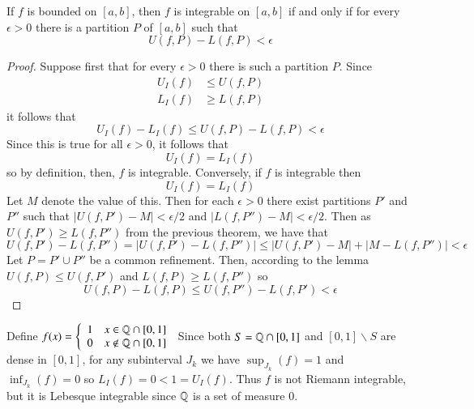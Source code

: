 \begin{theorem}
    If $f$ is bounded on $[a,b]$, then $f$ is integrable on $[a,b]$ if and only if for every $\epsilon > 0$ there is a partition $P$ of $[a, b]$ such that $$U(f,P) - L(f,P) < \epsilon$$
\end{theorem}
\begin{proof}
    Suppose first that for every $\epsilon > 0$ there is such a partition $P$. Since \begin{align*}
        U_I(f) &\leq U(f,P) \\
        L_I(f) &\geq L(f,P)
    \end{align*}
    it follows that \begin{equation*}
        U_I(f) - L_I(f) \leq U(f,P) - L(f,P) < \epsilon
    \end{equation*}
    Since this is true for all $\epsilon > 0$, it follows that \begin{equation*}
        U_I(f) = L_I(f)
    \end{equation*}
    so by definition, then, $f$ is integrable. Conversely, if $f$ is integrable then \begin{equation*}
        U_I(f) = L_I(f)
    \end{equation*}
    Let $M$ denote the value of this. Then for each $\epsilon > 0$ there exist partitions $P'$ and $P''$ such that $|U(f,P') - M| <\epsilon/2$ and $|L(f,P'') - M| < \epsilon/2$. Then as $U(f,P') \geq L(f,P'')$ from the previous theorem, we have that \begin{equation*}
        U(f,P') - L(f,P'') = |U(f,P') - L(f,P'')| \leq |U(f,P') - M| + |M - L(f,P'')| < \epsilon
    \end{equation*}
    Let $P = P' \cup P''$ be a common refinement. Then, according to the lemma $U(f,P) \leq U(f,P')$ and $L(f,P) \geq L(f,P'')$ so \begin{equation*}
		U(f,P) - L(f,P) \leq U(f,P'') - L(f,P') <\epsilon
	\end{equation*}
\end{proof}

\begin{example}
    Define $f(x) = \left\{\begin{array}{cc} 1 & x \in \mathbb Q\cap[0,1] \\ 0 & x \notin \mathbb Q\cap [0,1]  \end{array}\right.$ Since both $S = \mathbb Q\cap [0,1]$ and $[0,1]\backslash S$ are dense in $[0,1]$, for any subinterval $J_k$ we have $\sup_{J_k}(f) = 1$ and $\inf_{J_k}(f) = 0$ so $L_I(f) = 0 < 1 = U_I(f)$. Thus $f$ is not Riemann integrable, but it is Lebesque integrable since $\mathbb Q$ is a set of measure $0$.
\end{example}


